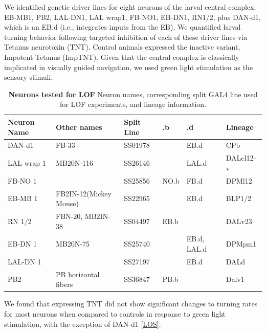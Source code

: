     We identified genetic driver lines for eight neurons of the larval central complex: EB-MB1, PB2, LAL-DN1, LAL wrap1, FB-NO1, EB-DN1, RN1/2, plus DAN-d1, which is an EB.d (i.e., integrates inputs from the EB). 
    We quantified larval turning behavior following targeted inhibition of each of these driver lines via Tetanus neurotoxin (TNT).
    Control animals expressed the inactive variant, Impotent Tetanus (ImpTNT).
    Given that the central complex is classically implicated in visually guided navigation, we used green light stimulation as the sensory stimuli.
     \begin{table}[h!]
    \centering
    \begin{tabular}{llllll}
    \toprule
    \textbf{Neuron Name} & \textbf{Other names} & \textbf{Split Line} & \textbf{.b} & \textbf{.d} & \textbf{Lineage} \\ 
    \midrule
    DAN-d1      &   FB-33         & SS01978 &       & EB.d        & CPb        \\ 
    LAL wrap 1  & MB20N-116       & SS26146 &       & LAL.d       &  DALcl12-v  \\ 
    FB-NO 1     &                 & SS25856 & NO.b  & FB.d        &  DPMl12    \\ 
    EB-MB 1     & FB2IN-12(Mickey Mouse)& SS22965 &       & EB.d    & BLP1/2    \\ 
    RN 1/2      & FBN-20, MB2IN-38 & SS04497 & EB.b  &             &  DALv23    \\ 
    EB-DN 1     & MB20N-75        & SS25740 &       & EB.d, LAL.d & DPMpm1 \\ 
    LAL-DN 1    &                 & SS27197 &       & EB.d            & DALd   \\ 
    PB2         & PB horizontal fibers & SS36847 & PB.b      &             & Dalv1  \\ 
    \bottomrule
    \end{tabular}
    \caption{ \textbf{Neurons tested for LOF} Neuron names, corresponding split GAL4 line used for LOF experiments, and lineage information.}
    \end{table}

    We found that expressing TNT did not show significant changes to turning rates for most neurons when compared to controls in response to green light stimulation, with the exception of DAN-d1 \ref{LOS}. 



